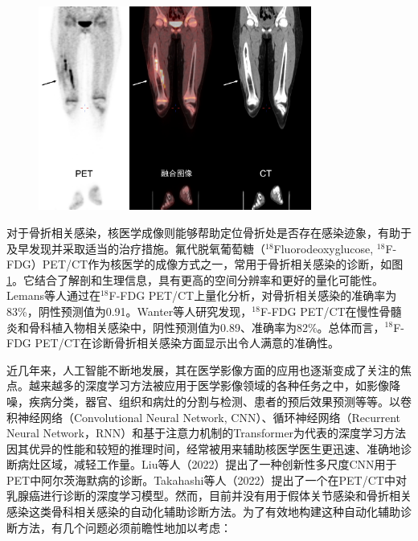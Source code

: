 \begin{figure}[ht]
  \centering
  \includegraphics[width=0.8\textwidth]{figures/chap01_PETCT.jpg}
  \label{fig:chap01_PETCT}
\end{figure}

对于骨折相关感染，核医学成像则能够帮助定位骨折处是否存在感染迹象，有助于及早发现并采取适当的治疗措施。氟代脱氧葡萄糖（\(^{18}\)Fluorodeoxyglucose, \(^{18}\)F-FDG）PET/CT作为核医学的成像方式之一，常用于骨折相关感染的诊断\cite{zhang2021comparative}，如图\ref{fig:chap01_PETCT}。它结合了解剖和生理信息，具有更高的空间分辨率和更好的量化可能性\cite{gholamrezanezhad2018clinical}。Lemans等人\cite{lemans2019diagnostic}通过在\(^{18}\)F-FDG PET/CT上量化分析，对骨折相关感染的准确率为83\%，阴性预测值为0.91。Wanter等人\cite{wenter2016diagnostic}研究发现，\(^{18}\)F-FDG PET/CT在慢性骨髓炎和骨科植入物相关感染中，阴性预测值为0.89、准确率为82\%。总体而言，\(^{18}\)F-FDG PET/CT在诊断骨折相关感染方面显示出令人满意的准确性。

近几年来，人工智能不断地发展，其在医学影像方面的应用也逐渐变成了关注的焦点。越来越多的深度学习方法被应用于医学影像领域的各种任务之中，如影像降噪，疾病分类，器官、组织和病灶的分割与检测、患者的预后效果预测等等\cite{ZSZD202307032,YJTY202304021}。以卷积神经网络（Convolutional Neural Network, CNN）、循环神经网络（Recurrent Neural Network，RNN）和基于注意力机制的Transformer为代表的深度学习方法因其优异的性能和较短的推理时间，经常被用来辅助核医学医生更迅速、准确地诊断病灶区域，减轻工作量。Liu等人\cite{liu2022diagnosis}（2022）提出了一种创新性多尺度CNN用于PET中阿尔茨海默病的诊断。Takahashi等人\cite{takahashi2022deep}（2022）提出了一个在PET/CT中对乳腺癌进行诊断的深度学习模型。然而，目前并没有用于假体关节感染和骨折相关感染这类骨科相关感染的自动化辅助诊断方法。为了有效地构建这种自动化辅助诊断方法，有几个问题必须前瞻性地加以考虑：

